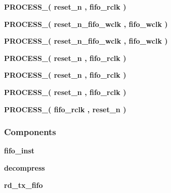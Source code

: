 \begin{DoxyCompactItemize}
\item 
{\bf P\+R\+O\+C\+E\+S\+S\+\_}{\bfseries  ( {\bfseries {\bfseries {\bf reset\+\_\+n}} \textcolor{vhdlchar}{ }} , {\bfseries {\bfseries {\bf fifo\+\_\+rclk}} \textcolor{vhdlchar}{ }} )}
\item 
{\bf P\+R\+O\+C\+E\+S\+S\+\_}{\bfseries  ( {\bfseries {\bfseries {\bf reset\+\_\+n\+\_\+fifo\+\_\+wclk}} \textcolor{vhdlchar}{ }} , {\bfseries {\bfseries {\bf fifo\+\_\+wclk}} \textcolor{vhdlchar}{ }} )}
\item 
{\bf P\+R\+O\+C\+E\+S\+S\+\_}{\bfseries  ( {\bfseries {\bfseries {\bf reset\+\_\+n\+\_\+fifo\+\_\+wclk}} \textcolor{vhdlchar}{ }} , {\bfseries {\bfseries {\bf fifo\+\_\+wclk}} \textcolor{vhdlchar}{ }} )}
\item 
{\bf P\+R\+O\+C\+E\+S\+S\+\_}{\bfseries  ( {\bfseries {\bfseries {\bf reset\+\_\+n}} \textcolor{vhdlchar}{ }} , {\bfseries {\bfseries {\bf fifo\+\_\+rclk}} \textcolor{vhdlchar}{ }} )}
\item 
{\bf P\+R\+O\+C\+E\+S\+S\+\_}{\bfseries  ( {\bfseries {\bfseries {\bf reset\+\_\+n}} \textcolor{vhdlchar}{ }} , {\bfseries {\bfseries {\bf fifo\+\_\+rclk}} \textcolor{vhdlchar}{ }} )}
\item 
{\bf P\+R\+O\+C\+E\+S\+S\+\_}{\bfseries  ( {\bfseries {\bfseries {\bf reset\+\_\+n}} \textcolor{vhdlchar}{ }} , {\bfseries {\bfseries {\bf fifo\+\_\+rclk}} \textcolor{vhdlchar}{ }} )}
\item 
{\bf P\+R\+O\+C\+E\+S\+S\+\_}{\bfseries  ( {\bfseries {\bfseries {\bf fifo\+\_\+rclk}} \textcolor{vhdlchar}{ }} , {\bfseries {\bfseries {\bf reset\+\_\+n}} \textcolor{vhdlchar}{ }} )}
\end{DoxyCompactItemize}
\subsubsection*{Components}
 \begin{DoxyCompactItemize}
\item 
{\bf fifo\+\_\+inst}  {\bfseries }  
\item 
{\bf decompress}  {\bfseries }  
\item 
{\bf rd\+\_\+tx\+\_\+fifo}  {\bfseries }  
\end{DoxyCompactItemize}
